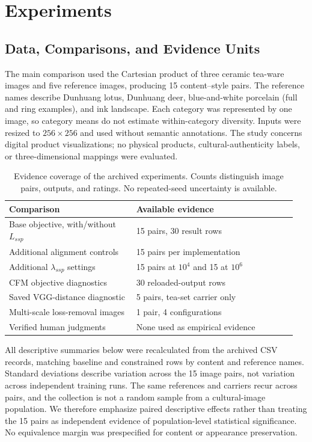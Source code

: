 \section{Experiments}
\label{sec:experiments}

\subsection{Data, Comparisons, and Evidence Units}
The main comparison used the Cartesian product of three ceramic tea-ware images and five reference images, producing 15 content--style pairs. The reference names describe Dunhuang lotus, Dunhuang deer, blue-and-white porcelain (full and ring examples), and ink landscape. Each category was represented by one image, so category means do not estimate within-category diversity. Inputs were resized to $256\times256$ and used without semantic annotations. The study concerns digital product visualizations; no physical products, cultural-authenticity labels, or three-dimensional mappings were evaluated.

\begin{table}[t]
\centering
\caption{Evidence coverage of the archived experiments. Counts distinguish image pairs, outputs, and ratings. No repeated-seed uncertainty is available.}
\label{tab:coverage}
\begin{tabular}{@{}p{0.42\linewidth}p{0.53\linewidth}@{}}
\toprule
Comparison & Available evidence \\
\midrule
Base objective, with/without $L_{ssp}$ & 15 pairs, 30 result rows \\
Additional alignment controls & 15 pairs per implementation \\
Additional $\lambda_{ssp}$ settings & 15 pairs at $10^4$ and 15 at $10^6$ \\
CFM objective diagnostics & 30 reloaded-output rows \\
Saved VGG-distance diagnostic & 5 pairs, tea-set carrier only \\
Multi-scale loss-removal images & 1 pair, 4 configurations \\
Verified human judgments & None used as empirical evidence \\
\bottomrule
\end{tabular}
\end{table}

All descriptive summaries below were recalculated from the archived CSV records, matching baseline and constrained rows by content and reference names. Standard deviations describe variation across the 15 image pairs, not variation across independent training runs. The same references and carriers recur across pairs, and the collection is not a random sample from a cultural-image population. We therefore emphasize paired descriptive effects rather than treating the 15 pairs as independent evidence of population-level statistical significance. No equivalence margin was prespecified for content or appearance preservation.


